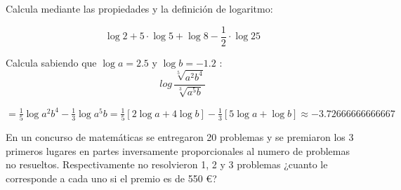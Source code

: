 \documentclass[addpoints,spanish, 12pt,a4paper]{exam}
\begin{document}
\begin{questions}




\addpoints





\addpoints

\question[1] Calcula mediante las propiedades y la definición de logaritmo:

$$\log{2}+5\cdot\log{5}+\log{8}-\frac{1}{2}\cdot\log{25}$$


\question[1] Calcula sabiendo que $\log a = 2.5$ y $\log b = -1.2$ :
 \[log\,\frac{\sqrt[5]{{a^2}{b^4}}  }{\sqrt[3]{{a^5}b} }\]
\begin{solution}
$=\frac{1}{5}\log {a^2b^4} - \frac{1}{3}\log {a^5b}=\frac{1}{5}\left[2\log a + 4\log b \right]-\frac{1}{3}\left[5\log a +\log b \right]\approx-3.72666666666667$
\end{solution}


\addpoints


\question[1] En un concurso de matemáticas se entregaron 20 problemas y se premiaron los 3 primeros lugares en partes inversamente proporcionales al numero de problemas no resueltos. Respectivamente no resolvieron 1, 2 y 3 problemas ¿cuanto le corresponde a cada uno si el premio es de  550 \euro?


\end{questions}
\end{document}
